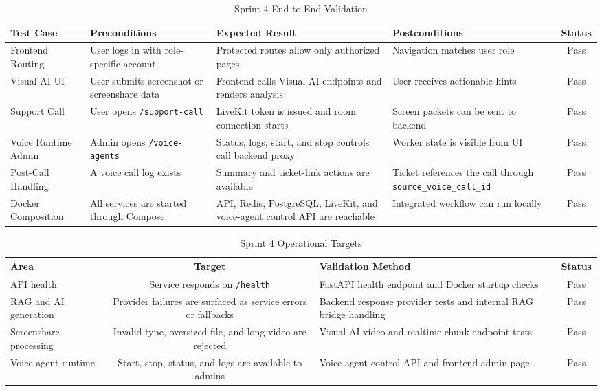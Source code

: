 \begin{table}[H]
\centering
\caption{Sprint 4 End-to-End Validation}
\label{tab:sprint4-tests}
\renewcommand{\arraystretch}{1.3}
\small
\begin{tabular}{|p{2.5cm}|p{3.0cm}|p{4.0cm}|p{2.7cm}|c|}
\hline
\textbf{Test Case} & \textbf{Preconditions} & \textbf{Expected Result} & \textbf{Postconditions} & \textbf{Status} \\
\hline
Frontend Routing & User logs in with role-specific account & Protected routes allow only authorized pages & Navigation matches user role & Pass \\
\hline
Visual AI UI & User submits screenshot or screenshare data & Frontend calls Visual AI endpoints and renders analysis & User receives actionable hints & Pass \\
\hline
Support Call & User opens \texttt{/support-call} & LiveKit token is issued and room connection starts & Screen packets can be sent to backend & Pass \\
\hline
Voice Runtime Admin & Admin opens \texttt{/voice-agents} & Status, logs, start, and stop controls call backend proxy & Worker state is visible from UI & Pass \\
\hline
Post-Call Handling & A voice call log exists & Summary and ticket-link actions are available & Ticket references the call through \texttt{source\_voice\_call\_id} & Pass \\
\hline
Docker Composition & All services are started through Compose & API, Redis, PostgreSQL, LiveKit, and voice-agent control API are reachable & Integrated workflow can run locally & Pass \\
\hline
\end{tabular}
\end{table}

\begin{table}[H]
\centering
\caption{Sprint 4 Operational Targets}
\label{tab:sprint4-metrics}
\renewcommand{\arraystretch}{1.2}
\begin{tabular}{|l|c|p{5.2cm}|c|}
\hline
\textbf{Area} & \textbf{Target} & \textbf{Validation Method} & \textbf{Status} \\
\hline
API health & Service responds on \texttt{/health} & FastAPI health endpoint and Docker startup checks & Pass \\
\hline
RAG and AI generation & Provider failures are surfaced as service errors or fallbacks & Backend response provider tests and internal RAG bridge handling & Pass \\
\hline
Screenshare processing & Invalid type, oversized file, and long video are rejected & Visual AI video and realtime chunk endpoint tests & Pass \\
\hline
Voice-agent runtime & Start, stop, status, and logs are available to admins & Voice-agent control API and frontend admin page & Pass \\
\hline
\end{tabular}
\end{table}

